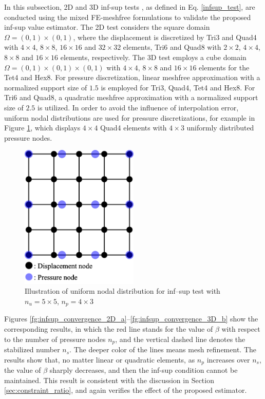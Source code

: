 In this subsection, 2D and 3D inf-sup tests \cite{chapelle1993}, as defined in Eq. \ref{infsup_test}, are conducted using the mixed FE-meshfree formulations to validate the proposed inf-sup value estimator.
The 2D test considers the square domain $\Omega = (0,1)\times (0,1)$, where the displacement is discretized by Tri3 and Quad4 with $4\times 4$, $8\times 8$, $16\times 16$ and $32\times 32$ elements, Tri6 and Quad8 with $2\times 2$, $4\times 4$, $8\times 8$ and $16\times 16$ elements, respectively. The 3D test employs a cube domain $\Omega = (0,1)\times (0,1)\times (0,1)$ with $4\times 4$, $8\times 8$ and $16\times 16$ elements for the Tet4 and Hex8.
For pressure discretization, linear meshfree approximation with a normalized support size of $1.5$ is employed for Tri3, Quad4, Tet4 and Hex8.
For Tri6 and Quad8, a quadratic meshfree approximation with a normalized support size of $2.5$ is utilized.
In order to avoid the influence of interpolation error, uniform nodal distributions are used for pressure discretizations, for example in Figure \ref{fg:infsup_mesh}, which displays $4\times4$ Quad4 elements with $4\times3$ uniformly distributed pressure nodes.

\begin{figure}[H]
\centering
\includegraphics[width=0.5\textwidth]{png/infsup_mesh.png}
\caption{Illustration of uniform nodal distribution for inf--sup test with $n_u=5\times5$, $n_p=4\times3$}\label{fg:infsup_mesh}
\end{figure}

Figures \ref{fg:infsup_convergence_2D_a}--\ref{fg:infsup_convergence_3D_b} show the corresponding results, in which the red line stands for the value of $\beta$ with respect to the number of pressure nodes $n_p$, and the vertical dashed line denotes the stabilized number $n_s$. The deeper color of the lines means mesh refinement. The results show that, no matter linear or quadratic elements, as $n_p$ increases over $n_s$, the value of $\beta$ sharply decreases, and then the inf-sup condition cannot be maintained. This result is consistent with the discussion in Section \ref{sec:constraint_ratio}, and again verifies the effect of the proposed estimator.

